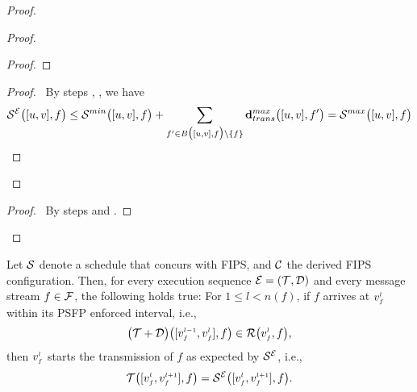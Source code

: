 \begin{proof}
\begin{proof}
\begin{proof}
	\end{proof}
	\qedstep
	\begin{proof}
	    \pf\ By steps , , we have
	    \begin{align*}
	      \SE{[u,v],f} \leq \Smin{[u,v],f} + \sum_{f' \in \I{[u,v], f} \backslash \{f\}} \dpdbtransmax{[u,v],f'} = \Smax{[u,v],f}
	    \end{align*}
	\end{proof}
    \end{proof}
    \qedstep
    \begin{proof}
	\pf\ By steps  and . 
    \end{proof}
\end{proof}

\begin{lemma}\label{lemma:fips}
  Let $\S{}$ denote a schedule that concurs with FIPS, and $\Conf$ the derived FIPS configuration. 
    Then, for every execution sequence $\E = (\T{}, \D{})$ and every message stream $f \in \TT$, the following holds true:
    For $1 \leq l < n(f)$, if $f$ arrives at $\v{l}{f}$ within its PSFP enforced interval, i.e.,
    \begin{equation*}
      \add{\T}{\D}{\pclink{l}{f},f} \in \R{\v{l}{f},f},
    \end{equation*}
    then $\v{l}{f}$ starts the transmission of $f$ as expected by $\S{}^\E$, i.e.,
    \begin{equation*}
      \T{\clink{l}{f},f} = \SE{\clink{l}{f},f}.
    \end{equation*}
\end{lemma}
